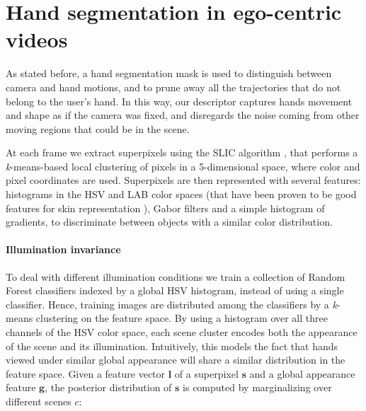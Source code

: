 \documentclass[11pt, oneside]{Thesis} %
\begin{document}
\mainmatter %

\pagestyle{fancy} %






\chapter{Hand segmentation in ego-centric videos}
As stated before, a hand segmentation mask is used to distinguish between camera and hand motions, and to prune away all the trajectories that do not belong to the user's hand. In this way, our descriptor captures hands movement and shape as if the camera was fixed, and disregards the noise coming from other moving regions that could be in the scene.

At each frame we extract superpixels using the SLIC algorithm \cite{achanta2012slic}, that performs a \textsl{k}-means-based local clustering of pixels in a 5-dimensional space, where color and pixel coordinates are used. Superpixels are then represented with several features: histograms in the HSV and LAB color spaces (that have been proven to be good features for skin representation \cite{khan2010skin}), Gabor filters and a simple histogram of gradients, to discriminate between objects with a similar color distribution.

\subsubsection{Illumination invariance}
To deal with different illumination conditions we train a collection of Random Forest classifiers indexed by a global HSV histogram, instead of using a single classifier. Hence, training images are distributed among the classifiers by a \textsl{k}-means clustering on the feature space. By using a histogram over all three channels of the HSV color space, each scene cluster encodes both the appearance of the scene and its illumination. Intuitively, this models the fact that hands viewed under similar global appearance will share a similar distribution in the feature space. Given a feature vector $\mathbf{l}$ of a superpixel $\mathbf{s}$ and a global appearance
feature $\mathbf{g}$, the posterior distribution of $\mathbf{s}$
is computed by marginalizing over different scenes $c$:
\end{document}

